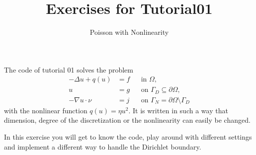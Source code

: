 \documentclass[12pt,a4paper]{article}
\title{\textbf{Exercises for Tutorial01}}
\subtitle{Poisson with Nonlinearity}
\begin{document}
\exerciseheader

The code of tutorial 01 solves the problem
\begin{align*}
  -\Delta u + q(u) &= f &&\text{in $\Omega$},\\
  u &= g &&\text{on $\Gamma_D\subseteq\partial\Omega$},\\
  -\nabla u\cdot \nu &= j &&\text{on $\Gamma_N=\partial\Omega\setminus\Gamma_D$}
\end{align*}
with the nonlinear function $q(u)=\eta u^2$.  It is written in such
a way that dimension, degree of the discretization or the
nonlinearity can easily be changed.

In this exercise you will get to know the code, play around with
different settings and implement a different way to handle the
Dirichlet boundary.
\end{document}
